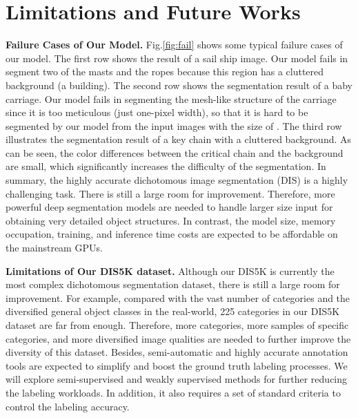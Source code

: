 \documentclass[10pt,twocolumn,letterpaper]{article}
\newcommand{\figref}[1]{Fig.\ref{#1}}
\begin{document}
\section{Limitations and Future Works} 



\noindent
\textbf{Failure Cases of Our Model.} \figref{fig:fail} shows some typical failure cases of our model. The first row shows the result of a sail ship image. Our model fails in segment two of the masts and the ropes because this region has a cluttered background (a building). The second row shows the segmentation result of a baby carriage. Our model fails in segmenting the mesh-like structure of the carriage since it is too meticulous (just one-pixel width), so that it is hard to be segmented by our model from the input images with the size of . The third row illustrates the segmentation result of a key chain with a cluttered background. As can be seen, the color differences between the critical chain and the background are small, which significantly increases the difficulty of the segmentation. 
In summary, the highly accurate dichotomous image segmentation (DIS) is a highly challenging task. There is still a large room for improvement. Therefore, more powerful deep segmentation models are needed to handle larger size input for obtaining very detailed object structures. In contrast, the model size, memory occupation, training, and inference time costs are expected to be affordable on the mainstream GPUs. 

\noindent
\textbf{Limitations of Our DIS5K dataset.} Although our DIS5K is currently the most complex dichotomous segmentation dataset, there is still a large room for improvement. For example, compared with the vast number of categories and the diversified general object classes in the real-world, 225 categories in our DIS5K dataset are far from enough. Therefore, more categories, more samples of specific categories, and more diversified image qualities are needed to further improve the diversity of this dataset. Besides, semi-automatic and highly accurate annotation tools are expected to simplify and boost the ground truth labeling processes. We will explore semi-supervised and weakly supervised methods for further reducing the labeling workloads. In addition, it also requires a set of standard criteria to control the labeling accuracy. 
\end{document}
